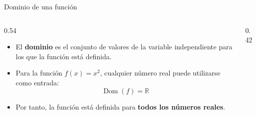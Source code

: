 \documentclass[main.tex]{subfiles}
\begin{document}
\begin{frame}{Dominio de una función}
  \begin{columns}[c,onlytextwidth]
    \begin{column}{0.54\textwidth}
      \begin{itemize}
        \item El \textbf{dominio} es el conjunto de valores de la variable
              independiente para los que la función está definida.

        \item Para la función $f(x)=x^2$, cualquier número real
              puede utilizarse como entrada:
              \[
                \operatorname{Dom}(f)=\mathbb{R}
              \]

        \item Por tanto, la función está definida para \textbf{todos los
              números reales}.
      \end{itemize}
    \end{column}
    \begin{column}{0.42\textwidth}
      \centering
    \end{column}
  \end{columns}
\end{frame}
\end{document}
